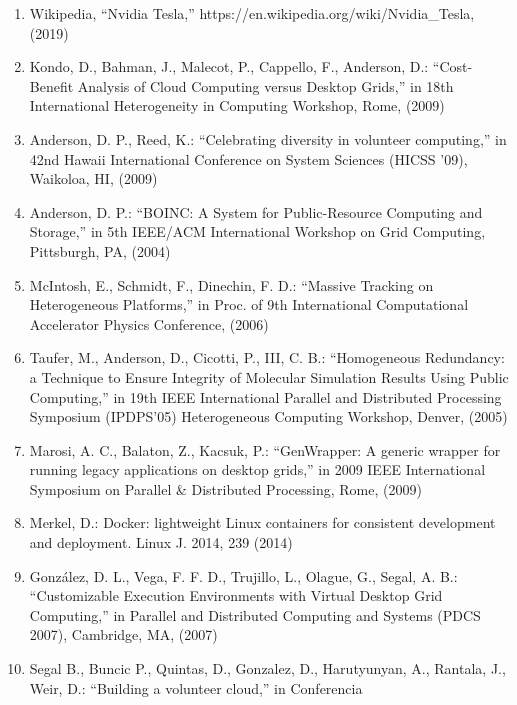 \documentclass[
]{article}
\begin{document}
\begin{enumerate}
\item
  Wikipedia, ``Nvidia Tesla,''
  https://en.wikipedia.org/wiki/Nvidia\_Tesla, (2019)\\
\item
  Kondo, D., Bahman, J., Malecot, P., Cappello, F., Anderson, D.:
  ``Cost-Benefit Analysis of Cloud Computing versus Desktop Grids,'' in
  18th International Heterogeneity in Computing Workshop, Rome, (2009)\\
\item
  Anderson, D. P., Reed, K.: ``Celebrating diversity in volunteer
  computing,'' in 42nd Hawaii International Conference on System
  Sciences (HICSS '09), Waikoloa, HI, (2009)\\
\item
  Anderson, D. P.: ``BOINC: A System for Public-Resource Computing and
  Storage,'' in 5th IEEE/ACM International Workshop on Grid Computing,
  Pittsburgh, PA, (2004)\\
\item
  McIntosh, E., Schmidt, F., Dinechin, F. D.: ``Massive Tracking on
  Heterogeneous Platforms,'' in Proc. of 9th International Computational
  Accelerator Physics Conference, (2006)
\item
  Taufer, M., Anderson, D., Cicotti, P., III, C. B.: ``Homogeneous
  Redundancy: a Technique to Ensure Integrity of Molecular Simulation
  Results Using Public Computing,'' in 19th IEEE International Parallel
  and Distributed Processing Symposium (IPDPS'05) Heterogeneous
  Computing Workshop, Denver, (2005)\\
\item
  Marosi, A. C., Balaton, Z., Kacsuk, P.: ``GenWrapper: A generic
  wrapper for running legacy applications on desktop grids,'' in 2009
  IEEE International Symposium on Parallel \& Distributed Processing,
  Rome, (2009)\\
\item
  Merkel, D.: Docker: lightweight Linux containers for consistent
  development and deployment. Linux J. 2014, 239 (2014)\\
\item
  González, D. L., Vega, F. F. D., Trujillo, L., Olague, G., Segal, A.
  B.: ``Customizable Execution Environments with Virtual Desktop Grid
  Computing,'' in Parallel and Distributed Computing and Systems (PDCS
  2007), Cambridge, MA, (2007)\\
\item
  Segal B., Buncic P., Quintas, D., Gonzalez, D., Harutyunyan, A.,
  Rantala, J., Weir, D.: ``Building a volunteer cloud,'' in Conferencia

\end{enumerate}
\end{document}
